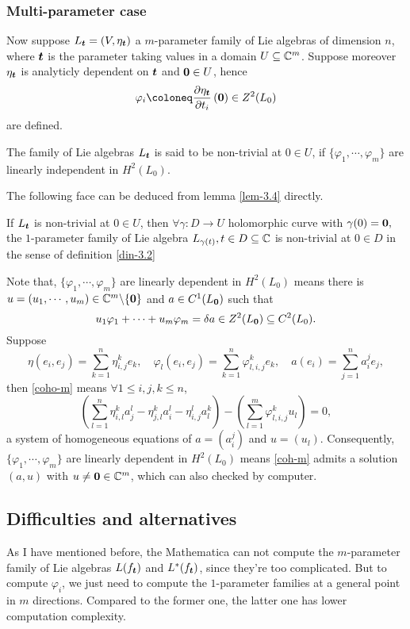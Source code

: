 \subsubsection{Multi-parameter case}
Now suppose $L_{\boldsymbol t}=(V,\eta_{\boldsymbol t})$ a $m$-parameter family of Lie algebras of dimension $n$, where ${\boldsymbol t}$ is the parameter taking values in a domain $U \subseteq {\mathbb{C}}^m$. Suppose moreover $\eta_{\boldsymbol t}$ is analyticly dependent on ${\boldsymbol t}$ and  ${\boldsymbol 0} \in U$, hence  
\[\varphi_i \coloneq \pd{\eta_\bt}{t_i}\left(\0\right) \in Z^2(L_0)\]
are defined.  
\begin{definition}\label{din-3.5}
  The family of Lie algebras $L_{\boldsymbol t}$ is said to be non-trivial at $0\in U$, if  $\{\varphi_1,\cdots, \varphi_m\}$ are linearly independent in $H^2\left(L_0\right)$.
\end{definition}
The following face can be deduced from lemma \ref{lem-3.4} directly.
\begin{lemma}\label{lem-3.5}
  If $L_{\boldsymbol t}$ is non-trivial at $0\in U$,  then $\forall \gamma\colon D \to U$ holomorphic curve with $\gamma(0)= {\boldsymbol 0},$ the $1$-parameter family of Lie algebra $L_{\gamma(t) }, t\in D \subseteq {\mathbb{C}}$ is non-trivial at $0\in D$ in the sense of definition \ref{din-3.2}
\end{lemma}
Note that, $\{\varphi_1,\cdots, \varphi_m\}$ are linearly dependent in $H^2\left(L_0 \right ) $ means there is $u=(u_1,\cdots, u_m)\in {\mathbb{C}}^m\backslash \{{\boldsymbol 0}\}$ and $a\in C^1(L_{\boldsymbol 0})$ such that
\begin{equation}\label{coho-m}
  u_1\varphi_1+\cdots +u_m\varphi_m = \delta a \in Z^2(L_{\boldsymbol 0})\subseteq C^2(L_0).
\end{equation}
Suppose
\[\eta(e_i,e_j)=\sum_{k=1}^n\eta_{i,j}^k e_k,\quad
  \varphi_l(e_i,e_j)=\sum_{k=1}^n\varphi_{l,i,j}^k e_k,\quad
  a(e_i)=\sum_{j=1}^na_i^j e_j,
\]
then \eqref{coho-m} means  $\forall 1\leqslant i , j, k \leqslant n$,
\begin{equation}\label{coh-m}
  \left( \sum_{l=1}^n \eta_{i,l}^k a_j^l-\eta_{j,l}^ka_i^l-\eta_{i,j}^la_l^k \right) -\left( \sum_{l=1}^m \varphi_{l,i,j}^k u_l\right) 
  =0,
\end{equation}
a system of homogeneous equations of $a=(a_i^j)$ and $u=(u_l)$.
Consequently, $\{\varphi_1,\cdots, \varphi_m\}$ are linearly dependent in $H^2(L_0 )$ means \eqref{coh-m} admits a solution $(a,u)$ with $u\not={\boldsymbol 0}\in {\mathbb{C}}^m$, which can also checked by computer.

\subsection{Difficulties and alternatives}
As I have mentioned before, the Mathematica can not compute the $m$-parameter family of Lie algebras $L(f_{\boldsymbol t})$ and $L^*(f_{\boldsymbol t})$, since they're too complicated. But to compute $\varphi_i$, we just need to compute the $1$-parameter families at a general point in $m$ directions. Compared to the former one, the latter one has lower computation complexity.

